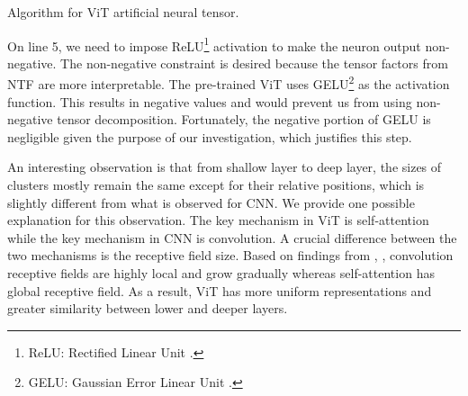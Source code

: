 \setcounter{algocf}{2}
\begin{algorithm}[H]
\caption{Algorithm for ViT artificial neural tensor.}\label{alg:vit-tensor}
\DontPrintSemicolon
\end{algorithm}

\begin{rmk}
On line 5, we need to impose ReLU\footnote{ReLU: Rectified Linear Unit \cite{relu}.} activation to make the neuron output non-negative. The non-negative constraint is desired because the tensor factors from NTF are more interpretable. The pre-trained ViT uses GELU\footnote{GELU: Gaussian Error Linear Unit \cite{gelu}.} as the activation function. This results in negative values and would prevent us from using non-negative tensor decomposition. Fortunately, the negative portion of GELU is negligible given the purpose of our investigation, which justifies this step.
\end{rmk}

An interesting observation is that from shallow layer to deep layer, the sizes of clusters mostly remain the same except for their relative positions, which is slightly different from what is observed for CNN. We provide one possible explanation for this observation. The key mechanism in ViT is self-attention while the key mechanism in CNN is convolution. A crucial difference between the two mechanisms is the receptive field size. Based on findings from \cite{raghu_vision_2021}, \cite{coatnet_2021}, convolution receptive fields are highly local and grow gradually whereas self-attention has global receptive field. As a result, ViT has more uniform representations and greater similarity between lower and deeper layers. 

